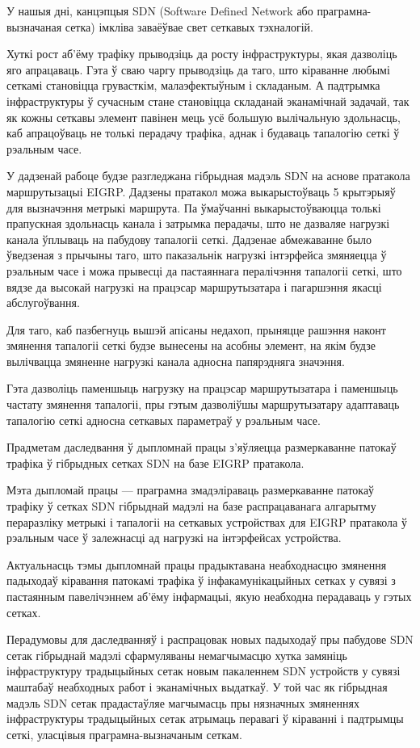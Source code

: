 \sectionWithoutNumber{\prefacename}

У нашыя дні, канцэпцыя SDN (Software Defined Network або праграмна-вызначаная сетка)
імкліва заваёўвае свет сеткавых тэхналогій.

Хуткі рост аб'ёму трафіку прыводзіць да росту інфраструктуры, якая
дазволіць яго апрацаваць. Гэта ў сваю чаргу прыводзіць да таго, што кіраванне
любымі сеткамі становіцца грувасткім, малаэфектыўным і складаным.
А падтрымка інфраструктуры ў сучасным стане становіцца складанай эканамічнай задачай,
так як кожны сеткавы элемент павінен мець усё большую вылічальную здольнасць, каб
апрацоўваць не толькі перадачу трафіка, аднак і будаваць тапалогію сеткі ў рэальным часе.

У дадзенай рабоце будзе разгледжана гібрыдная мадэль
SDN на аснове пратакола маршрутызацыі EIGRP.
Дадзены пратакол можа выкарыстоўваць 5 крытэрыяў для вызначэння метрыкі маршрута.
Па ўмаўчанні выкарыстоўваюцца толькі прапускная здольнасць канала і затрымка перадачы,
што не дазваляе нагрузкі канала ўплываць на пабудову тапалогіі сеткі.
Дадзенае абмежаванне было ўведзеная з прычыны таго, што паказальнік нагрузкі інтэрфейса
змяняецца ў рэальным часе і можа прывесці да пастаяннага пералічэння тапалогіі сеткі, што
вядзе да высокай нагрузкі на працэсар маршрутызатара і пагаршэння якасці абслугоўвання.

Для таго, каб пазбегнуць вышэй апісаны недахоп, прыняцце рашэння наконт змянення тапалогіі сеткі
будзе вынесены на асобны элемент, на якім будзе вылічвацца змяненне нагрузкі канала адносна
папярэдняга значэння.

Гэта дазволіць паменшыць нагрузку на працэсар маршрутызатара і паменшыць частату змянення
тапалогіі, пры гэтым дазволіўшы маршрутызатару адаптаваць тапалогію сеткі адносна сеткавых параметраў
у рэальным часе.

Прадметам даследвання ў дыпломнай працы з'яўляецца размеркаванне патокаў трафіка ў гібрыдных сетках SDN на базе EIGRP пратакола.

Мэта дыпломай працы --- праграмна змадэліраваць размеркаванне
патокаў трафіку ў сетках SDN гібрыднай мадэлі на базе распрацаванага алгарытму пераразліку метрыкі
і тапалогіі на сеткавых устройствах для EIGRP пратакола ў рэальным часе
ў залежнасці ад нагрузкі на інтэрфейсах устройства.

Актуальнасць тэмы дыпломнай працы прадыктавана неабходнасцю
змянення падыходаў кіравання патокамі трафіка ў інфакамунікацыйных сетках
у сувязі з пастаянным павелічэннем аб'ёму інфармацыі, якую неабходна
перадаваць у гэтых сетках.

Перадумовы для даследванняў і распрацовак новых падыходаў пры пабудове
SDN сетак гібрыднай мадэлі сфармуляваны немагчымасцю хутка замяніць
інфраструктуру традыцыйных сетак новым пакаленнем SDN устройств у сувязі маштабаў неабходных
работ і эканамічных выдаткаў. У той час як гібрыдная мадэль SDN сетак
прадастаўляе магчымасць пры нязначных змяненнях інфраструктуры традыцыйных сетак атрымаць перавагі ў кіраванні і падтрымцы сеткі, уласцівыя праграмна-вызначаным сеткам.


\clearpage
